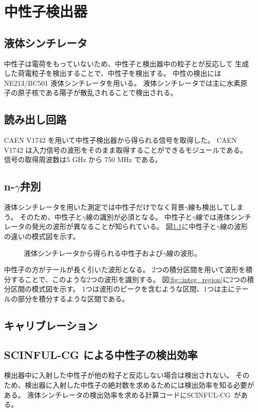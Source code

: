 \documentclass[../master]{subfiles}
\begin{document}
\chapter{中性子検出器}
\section{液体シンチレータ}
中性子は電荷をもっていないため、中性子と検出器中の粒子とが反応して
生成した荷電粒子を検出することで、中性子を検出する。
中性の検出にはNE213/BC501 液体シンチレータを用いる。
液体シンチレータでは主に水素原子の原子核である陽子が散乱されることで検出される。

\section{読み出し回路}
CAEN V1742 を用いて中性子検出器から得られる信号を取得した。
CAEN V1742 は入力信号の波形をそのまま取得することができるモジュールである。
信号の取得周波数は5 GHz から 750 MHz である。

\section{n-$\gamma$弁別}
液体シンチレータを用いた測定では中性子だけでなく背景$\gamma$線も検出してしまう。
そのため、中性子と$\gamma$線の識別が必須となる。
中性子と$\gamma$線では液体シンチレータの発光の波形が異なることが知られている。
図\ref{fig::pulse_shape_n_gamma}に中性子と$\gamma$線の波形の違いの模式図を示す。
\begin{figure}
  \centering
  \caption{液体シンチレータから得られる中性子および$\gamma$線の波形。}
  \label{fig::pulse_shape_n_gamma} 
\end{figure}
中性子の方がテールが長く引いた波形となる。
2つの積分区間を用いて波形を積分することで、このような2つの波形を識別する。
図\ref{fig::integ_region}に2つの積分区間の模式図を示す。
1つは波形のピークを含むような区間、1つは主にテールの部分を積分するような区間である。


\section{キャリブレーション}
\section{SCINFUL-CG による中性子の検出効率}
検出器中に入射した中性子が他の粒子と反応しない場合は検出されない。
そのため、検出器に入射した中性子の絶対数を求めるためには検出効率を知る必要がある。
液体シンチレータの検出効率を求める計算コードにSCINFUL-CG~\cite{scinful-cg}がある。
\end{document}
